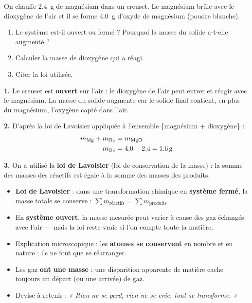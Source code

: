 \documentclass[11pt]{article}
\begin{document}
\begin{exercice}
On chauffe \SI{2,4}{g} de magnésium dans un creuset. Le magnésium brûle avec le dioxygène de l'air et il se forme \SI{4,0}{g} d'oxyde de magnésium  (poudre blanche).
\begin{enumerate}
\item Le système est-il ouvert ou fermé ? Pourquoi la masse du solide a-t-elle augmenté ?
\item Calculer la masse de dioxygène qui a réagi.
\item Citer la loi utilisée.
\end{enumerate}
\end{exercice}

\begin{corrige}
\textbf{1.} Le creuset est \textbf{ouvert} sur l'air : le dioxygène de l'air peut entrer et réagir avec le magnésium. La masse du solide augmente car le solide final contient, en plus du magnésium, l'oxygène capté dans l'air.

\textbf{2.} D'après la loi de Lavoisier appliquée à l'ensemble \{magnésium + dioxygène\} :
\begin{align*}
m_{\ce{Mg}} + m_{\ce{O2}} &= m_{\ce{MgO}} \\
m_{\ce{O2}} &= 4{,}0 - 2{,}4 = \SI{1,6}{g}
\end{align*}

\textbf{3.} On a utilisé la \textbf{loi de Lavoisier} (loi de conservation de la masse) : la somme des masses des réactifs est égale à la somme des masses des produits.
\end{corrige}

\begin{aretenir}
\begin{itemize}
\item \textbf{Loi de Lavoisier} : dans une transformation chimique en \textbf{système fermé}, la masse totale se conserve : $\sum m_{\text{réactifs}} = \sum m_{\text{produits}}$.
\item En \textbf{système ouvert}, la masse mesurée peut varier à cause des gaz échangés avec l'air — mais la loi reste vraie si l'on compte toute la matière.
\item Explication microscopique : les \textbf{atomes se conservent} en nombre et en nature ; ils ne font que se réarranger.
\item Les gaz \textbf{ont une masse} : une disparition apparente de matière cache toujours un départ (ou une arrivée) de gaz.
\item Devise à retenir : \emph{« Rien ne se perd, rien ne se crée, tout se transforme. »}
\end{itemize}
\end{aretenir}
\end{document}
